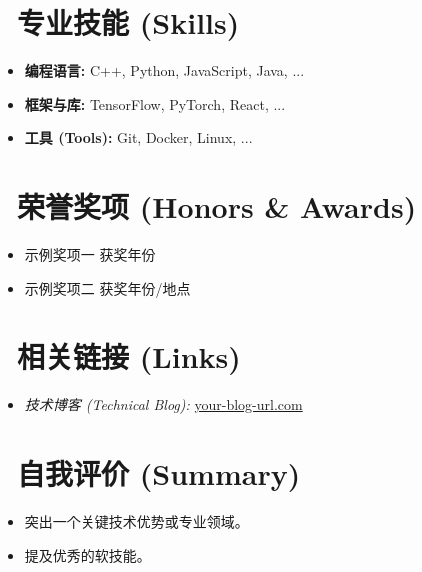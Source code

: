 \documentclass{resume} %
\begin{document}
\section{\faWrench\ 专业技能 (Skills)} %
\begin{itemize} %
    \item \textbf{编程语言:} C++, Python, JavaScript, Java, ...
    \item \textbf{框架与库:} TensorFlow, PyTorch, React, ...
    \item \textbf{工具 (Tools):} Git, Docker, Linux, ...
\end{itemize}

\section{\faDiamond\ 荣誉奖项 (Honors & Awards)} 
\begin{itemize} 
  \item 示例奖项一 \hfill{获奖年份}
  \item 示例奖项二 \hfill{获奖年份/地点}
\end{itemize}

\section{\faLink\ 相关链接 (Links)} 
\begin{itemize} 
    \item \textit{技术博客 (Technical Blog):} \href{https://your-blog-url.com}{your-blog-url.com}
\end{itemize}

\section{\faThumbsOUp\ 自我评价 (Summary)} 
\begin{itemize} 
  \item 突出一个关键技术优势或专业领域。
  \item 提及优秀的软技能。
\end{itemize}

\end{document}

